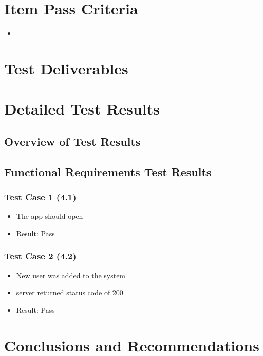 \documentclass[11pt]{article}
\begin{document}
\section{Item Pass Criteria}
\begin{itemize}
	\item 
	
\end{itemize}

\section{Test Deliverables}

\section{Detailed Test Results}
\subsection{Overview of Test Results}

\subsection{Functional Requirements Test Results}

\subsubsection{Test Case 1 (4.1)}
\begin{itemize}
	\item The app should open
	\item Result: Pass
\end{itemize}

\subsubsection{Test Case 2 (4.2)}
\begin{itemize}
	\item New user was added to the system
	\item server returned status code of 200
	\item 	Result: Pass
\end{itemize}


\section{Conclusions and Recommendations}
\end{document}
